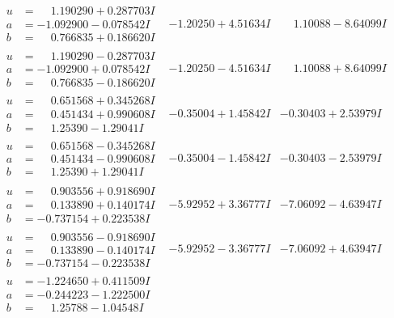 \documentclass[1p]{elsarticle_modified}
\theoremstyle{definition}
\begin{document}
$$\begin{array}{c|c|c}
\begin{aligned}
u &= \phantom{-}1.190290 + 0.287703 I \\
a &= -1.092900 - 0.078542 I \\
b &= \phantom{-}0.766835 + 0.186620 I\end{aligned}
 & -1.20250 + 4.51634 I & \phantom{-}1.10088 - 8.64099 I \\ \hline\begin{aligned}
u &= \phantom{-}1.190290 - 0.287703 I \\
a &= -1.092900 + 0.078542 I \\
b &= \phantom{-}0.766835 - 0.186620 I\end{aligned}
 & -1.20250 - 4.51634 I & \phantom{-}1.10088 + 8.64099 I \\ \hline\begin{aligned}
u &= \phantom{-}0.651568 + 0.345268 I \\
a &= \phantom{-}0.451434 + 0.990608 I \\
b &= \phantom{-}1.25390 - 1.29041 I\end{aligned}
 & -0.35004 + 1.45842 I & -0.30403 + 2.53979 I \\ \hline\begin{aligned}
u &= \phantom{-}0.651568 - 0.345268 I \\
a &= \phantom{-}0.451434 - 0.990608 I \\
b &= \phantom{-}1.25390 + 1.29041 I\end{aligned}
 & -0.35004 - 1.45842 I & -0.30403 - 2.53979 I \\ \hline\begin{aligned}
u &= \phantom{-}0.903556 + 0.918690 I \\
a &= \phantom{-}0.133890 + 0.140174 I \\
b &= -0.737154 + 0.223538 I\end{aligned}
 & -5.92952 + 3.36777 I & -7.06092 - 4.63947 I \\ \hline\begin{aligned}
u &= \phantom{-}0.903556 - 0.918690 I \\
a &= \phantom{-}0.133890 - 0.140174 I \\
b &= -0.737154 - 0.223538 I\end{aligned}
 & -5.92952 - 3.36777 I & -7.06092 + 4.63947 I \\ \hline\begin{aligned}
u &= -1.224650 + 0.411509 I \\
a &= -0.244223 - 1.222500 I \\
b &= \phantom{-}1.25788 - 1.04548 I\end{aligned}

\end{array}$$
\end{document}
